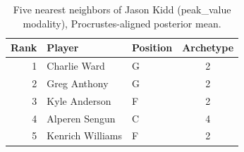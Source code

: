 \begin{table}[htbp]
  \centering\small
  \begin{tabular}{rllc}
    \toprule
    Rank & Player & Position & Archetype \\
    \midrule
    1 & Charlie Ward & G & 2 \\
    2 & Greg Anthony & G & 2 \\
    3 & Kyle Anderson & F & 2 \\
    4 & Alperen Sengun & C & 4 \\
    5 & Kenrich Williams & F & 2 \\
    \bottomrule
  \end{tabular}
  \caption{Five nearest neighbors of Jason Kidd (peak_value modality), Procrustes-aligned posterior mean.}
  \label{tab:Jason_Kidd_neighbors_peak_value}
\end{table}

